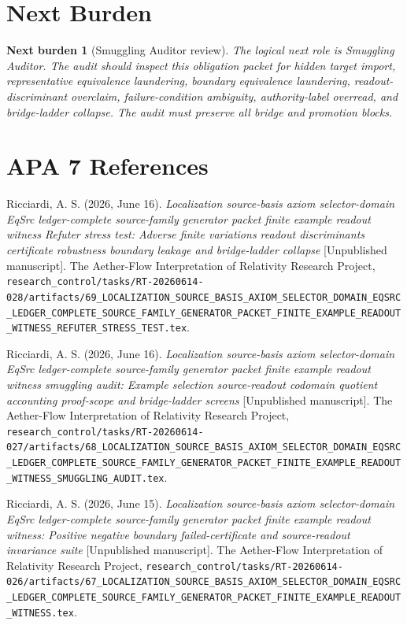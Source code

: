 \documentclass[11pt]{article}
\newtheorem{nextburden}{Next burden}
\begin{document}
\section{Next Burden}

\begin{nextburden}[Smuggling Auditor review]
The logical next role is Smuggling Auditor. The audit should inspect
this obligation packet for hidden target import, representative
equivalence laundering, boundary equivalence laundering,
readout-discriminant overclaim, failure-condition ambiguity,
authority-label overread, and bridge-ladder collapse. The audit must
preserve all bridge and promotion blocks.
\end{nextburden}

\section*{APA 7 References}

Ricciardi, A. S. (2026, June 16). \emph{Localization source-basis axiom
selector-domain EqSrc ledger-complete source-family generator packet
finite example readout witness Refuter stress test: Adverse finite
variations readout discriminants certificate robustness boundary
leakage and bridge-ladder collapse} [Unpublished manuscript]. The
Aether-Flow Interpretation of Relativity Research Project,
\texttt{research\_control/tasks/RT-20260614-028/artifacts/69\_LOCALIZATION\_SOURCE\_BASIS\_AXIOM\_SELECTOR\_DOMAIN\_EQSRC\_LEDGER\_COMPLETE\_SOURCE\_FAMILY\_GENERATOR\_PACKET\_FINITE\_EXAMPLE\_READOUT\_WITNESS\_REFUTER\_STRESS\_TEST.tex}.

Ricciardi, A. S. (2026, June 16). \emph{Localization source-basis axiom
selector-domain EqSrc ledger-complete source-family generator packet
finite example readout witness smuggling audit: Example selection
source-readout codomain quotient accounting proof-scope and
bridge-ladder screens} [Unpublished manuscript]. The Aether-Flow
Interpretation of Relativity Research Project,
\texttt{research\_control/tasks/RT-20260614-027/artifacts/68\_LOCALIZATION\_SOURCE\_BASIS\_AXIOM\_SELECTOR\_DOMAIN\_EQSRC\_LEDGER\_COMPLETE\_SOURCE\_FAMILY\_GENERATOR\_PACKET\_FINITE\_EXAMPLE\_READOUT\_WITNESS\_SMUGGLING\_AUDIT.tex}.

Ricciardi, A. S. (2026, June 15). \emph{Localization source-basis axiom
selector-domain EqSrc ledger-complete source-family generator packet
finite example readout witness: Positive negative boundary
failed-certificate and source-readout invariance suite} [Unpublished
manuscript]. The Aether-Flow Interpretation of Relativity Research
Project,
\texttt{research\_control/tasks/RT-20260614-026/artifacts/67\_LOCALIZATION\_SOURCE\_BASIS\_AXIOM\_SELECTOR\_DOMAIN\_EQSRC\_LEDGER\_COMPLETE\_SOURCE\_FAMILY\_GENERATOR\_PACKET\_FINITE\_EXAMPLE\_READOUT\_WITNESS.tex}.
\end{document}
